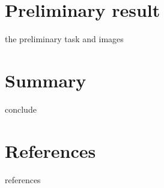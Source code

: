 \documentclass{article}
\begin{document}
\section{Preliminary result}

the preliminary task and images
\\
\section{Summary}

conclude 
\\
\section{References}





references
\end{document}
